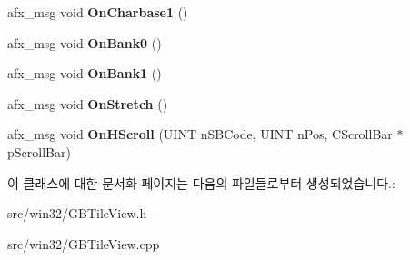 \begin{DoxyCompactItemize}
afx\+\_\+msg void {\bfseries On\+Charbase1} ()
\item 
\mbox{\label{class_g_b_tile_view_a35e281e40e9fd8867f04a01595f54ef2}} 
afx\+\_\+msg void {\bfseries On\+Bank0} ()
\item 
\mbox{\label{class_g_b_tile_view_a5c1db6a1066d8e37b743ca2407652b7d}} 
afx\+\_\+msg void {\bfseries On\+Bank1} ()
\item 
\mbox{\label{class_g_b_tile_view_a7386c9ed9651610461d4342ebd492bf9}} 
afx\+\_\+msg void {\bfseries On\+Stretch} ()
\item 
\mbox{\label{class_g_b_tile_view_a0b2b262f47b7d6c3f53270eaf80a24a1}} 
afx\+\_\+msg void {\bfseries On\+H\+Scroll} (U\+I\+NT n\+S\+B\+Code, U\+I\+NT n\+Pos, C\+Scroll\+Bar $\ast$p\+Scroll\+Bar)
\end{DoxyCompactItemize}


이 클래스에 대한 문서화 페이지는 다음의 파일들로부터 생성되었습니다.\+:\begin{DoxyCompactItemize}
\item 
src/win32/G\+B\+Tile\+View.\+h\item 
src/win32/G\+B\+Tile\+View.\+cpp\end{DoxyCompactItemize}
